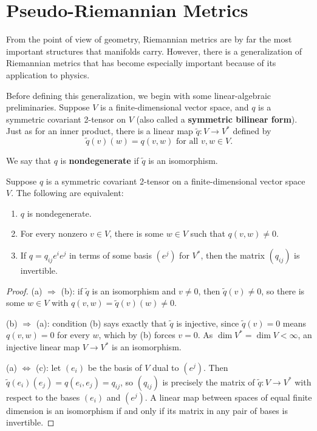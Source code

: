 \section{Pseudo-Riemannian Metrics}

From the point of view of geometry, Riemannian metrics are by far the most important structures that manifolds carry. However, there is a generalization of Riemannian metrics that has become especially important because of its application to physics.

Before defining this generalization, we begin with some linear-algebraic preliminaries. Suppose $V$ is a finite-dimensional vector space, and $q$ is a symmetric covariant 2-tensor on $V$ (also called a \textbf{symmetric bilinear form}). Just as for an inner product, there is a linear map $\tilde{q}: V \to V^*$ defined by
\[
\tilde{q}(v)(w) = q(v,w) \text{ for all } v, w \in V.
\]

We say that $q$ is \textbf{nondegenerate} if $\tilde{q}$ is an isomorphism.

\begin{lemma}
\label{lem:nondegenerate-symmetric-bilinear}
\leanok
{}
Suppose $q$ is a symmetric covariant 2-tensor on a finite-dimensional vector space $V$. The following are equivalent:
\begin{enumerate}
\item[(a)] $q$ is nondegenerate.
\item[(b)] For every nonzero $v \in V$, there is some $w \in V$ such that $q(v,w) \neq 0$.
\item[(c)] If $q = q_{ij} e^i e^j$ in terms of some basis $(e^j)$ for $V^*$, then the matrix $(q_{ij})$ is invertible.
\end{enumerate}
\end{lemma}

\begin{proof}
\leanok
(a) $\Rightarrow$ (b): if $\tilde q$ is an isomorphism and $v \neq 0$, then $\tilde q(v) \neq 0$, so there is some $w \in V$ with $q(v,w) = \tilde q(v)(w) \neq 0$.

(b) $\Rightarrow$ (a): condition (b) says exactly that $\tilde q$ is injective, since $\tilde q(v) = 0$ means $q(v,w) = 0$ for every $w$, which by (b) forces $v = 0$. As $\dim V^* = \dim V < \infty$, an injective linear map $V \to V^*$ is an isomorphism.

(a) $\Leftrightarrow$ (c): let $(e_i)$ be the basis of $V$ dual to $(e^j)$. Then $\tilde q(e_i)(e_j) = q(e_i, e_j) = q_{ij}$, so $(q_{ij})$ is precisely the matrix of $\tilde q : V \to V^*$ with respect to the bases $(e_i)$ and $(e^j)$. A linear map between spaces of equal finite dimension is an isomorphism if and only if its matrix in any pair of bases is invertible.
\end{proof}

